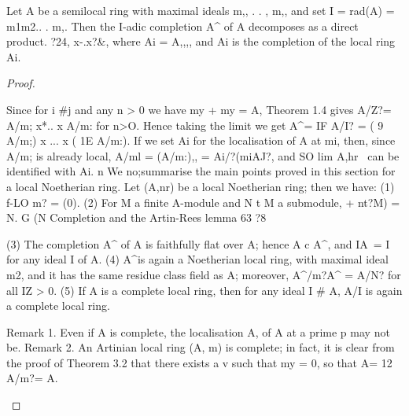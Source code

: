 \begin{theorem}[Theorem 8.15]\label{mcrt-auto-theorem-8-15}
\begin{mathematicalrecord}
Let A be a semilocal ring with maximal ideals m,, . . , m,,
and set I = rad(A) = m1m2.. . m,. Then the I-adic completion A^ of A
decomposes as a direct product.
          ?24,     x-.x?&,
where Ai = A,,,, and Ai is the completion of the local ring Ai.
\end{mathematicalrecord}
\end{theorem}
\begin{proof}
\begin{mathematicalrecord}
Since for i #j and any n > 0 we have my + my = A, Theorem 1.4
gives
          A/Z?= A/m; x*.. x A/m: for n>O.
Hence taking the limit we get
          A^= IF A/I? = ( 9 A/m;) x ... x ( 1E A/m:).
If we set Ai for the localisation of A at mi, then, since A/m; is already local,
          A/ml = (A/m:),, = Ai/?(miAJ?,
and SO lim A,hr~ can be identified with Ai.           n
   We no;summarise          the main points proved in this section for a local
Noetherian ring. Let (A,nr) be a local Noetherian ring; then we have:
   (1) f-LO m? = (0).
   (2) For M a finite A-module and N t M a submodule,
                  + nt?M) = N.
          G (N
Completion and the Artin-Rees              lemma                                     63
?8

   (3) The completion A^ of A is faithfully flat over A; hence A c A^, and
IA~\A = I for any ideal I of A.
   (4) A^is again a Noetherian local ring, with maximal ideal m2, and it has
the same residue class field as A; moreover, A^/m?A^ = A/N? for all IZ > 0.
   (5) If A is a complete local ring, then for any ideal I # A, A/I is again a
complete     local   ring.

Remark 1. Even if A is complete,             the localisation        A, of A at a prime p may
not be.
Remark 2. An Artinian local ring (A, m) is complete; in fact, it is clear from
the proof of Theorem 3.2 that there exists a v such that my = 0, so that
A= 12 A/m?= A.
\end{mathematicalrecord}
\end{proof}


